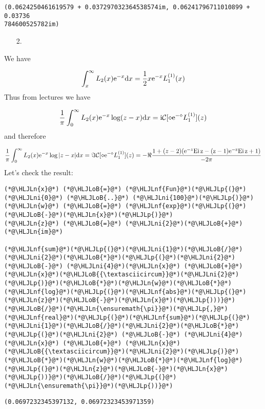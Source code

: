 \documentclass[12pt,a4paper]{article}
\newcommand{\HLJLn}[1]{#1}
\newcommand{\HLJLnf}[1]{\textcolor[RGB]{66,102,213}{#1}}
\newcommand{\HLJLni}[1]{\textcolor[RGB]{59,151,46}{#1}}
\newcommand{\HLJLoB}[1]{\textcolor[RGB]{102,102,102}{\textbf{#1}}}
\newcommand{\HLJLp}[1]{#1}
\def\D{ {\rm d} }
\def\I{ {\rm i} }
\def\E{ {\rm e} }
\def\CC{ {\cal C} }
\def\Ei{ {\rm Ei}\, }
\def\dx{\D x}
\def\Ei{\rm Ei\,}
\begin{document}
\begin{lstlisting}
(0.0624250461619579 + 0.037297032364538574im, 0.06241796711010899 + 0.03736
784600525782im)
\end{lstlisting}


\begin{itemize}
\item[2. ] \end{itemize}
We have

\[
\int_x^\infty L_2(x) \E^{-x} \dx = {1 \over 2} x \E^{-x} L_1^{(1)}(x)
\]
Thus from lectures we have

\[
{1 \over  \pi} \int_0^\infty L_2(x) \E^{-x} \log(z-x) \dx = \I\CC[ \diamond \E^{-\diamond} L_1^{(1)}](z)
\]
and therefore

\[
{1 \over \pi} \int_0^\infty L_2(x) \E^{-x} \log|z-x| \dx  = \Im \CC[ \diamond \E^{-\diamond} L_1^{(1)}](z) = -\Re{1  + (z-2) (\E^{-z} \Ei z - (z-1) \E^{-z} \Ei z +1) \over -2 \pi }
\]
Let's check the result:


\begin{lstlisting}
(*@\HLJLn{x}@*) (*@\HLJLoB{=}@*) (*@\HLJLnf{Fun}@*)(*@\HLJLp{(}@*)(*@\HLJLni{0}@*) (*@\HLJLoB{..}@*) (*@\HLJLni{100}@*)(*@\HLJLp{)}@*)
(*@\HLJLn{w}@*) (*@\HLJLoB{=}@*) (*@\HLJLnf{exp}@*)(*@\HLJLp{(}@*)(*@\HLJLoB{-}@*)(*@\HLJLn{x}@*)(*@\HLJLp{)}@*)
(*@\HLJLn{z}@*) (*@\HLJLoB{=}@*) (*@\HLJLni{2}@*)(*@\HLJLoB{+}@*)(*@\HLJLn{im}@*)

(*@\HLJLnf{sum}@*)(*@\HLJLp{(}@*)(*@\HLJLni{1}@*)(*@\HLJLoB{/}@*)(*@\HLJLni{2}@*)(*@\HLJLoB{*}@*)(*@\HLJLp{(}@*)(*@\HLJLni{2}@*) (*@\HLJLoB{-}@*) (*@\HLJLni{4}@*)(*@\HLJLn{x}@*) (*@\HLJLoB{+}@*) (*@\HLJLn{x}@*)(*@\HLJLoB{{\textasciicircum}}@*)(*@\HLJLni{2}@*)(*@\HLJLp{)}@*)(*@\HLJLoB{*}@*)(*@\HLJLn{w}@*)(*@\HLJLoB{*}@*)(*@\HLJLnf{log}@*)(*@\HLJLp{(}@*)(*@\HLJLnf{abs}@*)(*@\HLJLp{(}@*)(*@\HLJLn{z}@*)(*@\HLJLoB{-}@*)(*@\HLJLn{x}@*)(*@\HLJLp{)))}@*)(*@\HLJLoB{/}@*)(*@\HLJLn{\ensuremath{\pi}}@*)(*@\HLJLp{,}@*)(*@\HLJLnf{real}@*)(*@\HLJLp{(}@*)(*@\HLJLnf{sum}@*)(*@\HLJLp{(}@*)(*@\HLJLni{1}@*)(*@\HLJLoB{/}@*)(*@\HLJLni{2}@*)(*@\HLJLoB{*}@*)(*@\HLJLp{(}@*)(*@\HLJLni{2}@*) (*@\HLJLoB{-}@*) (*@\HLJLni{4}@*)(*@\HLJLn{x}@*) (*@\HLJLoB{+}@*) (*@\HLJLn{x}@*)(*@\HLJLoB{{\textasciicircum}}@*)(*@\HLJLni{2}@*)(*@\HLJLp{)}@*)(*@\HLJLoB{*}@*)(*@\HLJLn{w}@*)(*@\HLJLoB{*}@*)(*@\HLJLnf{log}@*)(*@\HLJLp{(}@*)(*@\HLJLn{z}@*)(*@\HLJLoB{-}@*)(*@\HLJLn{x}@*)(*@\HLJLp{))}@*)(*@\HLJLoB{/}@*)(*@\HLJLp{(}@*)(*@\HLJLn{\ensuremath{\pi}}@*)(*@\HLJLp{))}@*)
\end{lstlisting}

\begin{lstlisting}
(0.0697232345397132, 0.06972323453971359)
\end{lstlisting}
\end{document}
